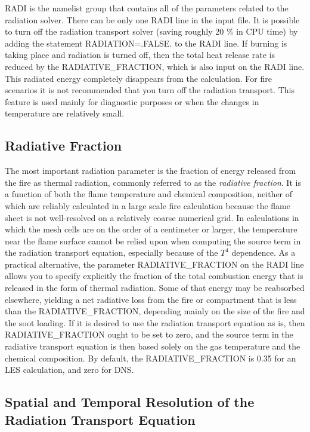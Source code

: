 \documentclass[11pt]{book}
\begin{document}
{\ct RADI} is the namelist group that contains all of the parameters related to the radiation solver. There can be only one
{\ct RADI} line in the input file. It is possible to turn off the radiation transport
solver (saving roughly 20 \% in CPU time) by adding the statement
{\ct RADIATION=.FALSE.} to the {\ct RADI} line.  If burning
is taking place and radiation is turned off, then the total heat
release rate is reduced by the {\ct RADIATIVE\_FRACTION}, which is
also input on the {\ct RADI} line. This radiated energy completely
disappears from the calculation. For fire scenarios it is not recommended that you turn off the
radiation transport. This feature is used mainly for diagnostic purposes or when the changes in
temperature are relatively small.

\subsection{Radiative Fraction}

The most important radiation parameter is the fraction of energy released from the
fire as thermal radiation, commonly referred to as the {\em radiative fraction}. It is a function of both the flame temperature
and chemical composition, neither of which are reliably calculated in a large
scale fire calculation because the flame sheet is not well-resolved on a relatively coarse numerical grid.
In calculations in which the mesh cells are on the order of a centimeter or
larger, the temperature near the flame surface cannot be relied upon when
computing the source term in the radiation transport equation, especially
because of the $T^4$ dependence.
As a practical alternative, the parameter {\ct RADIATIVE\_FRACTION} on the {\ct RADI} line allows you to specify explicitly the
fraction of the total combustion energy that is released in the form of thermal radiation.
Some of that energy may be reabsorbed elsewhere, yielding a net radiative
loss from the fire or compartment that is less than the {\ct RADIATIVE\_FRACTION}, depending mainly on the size of
the fire and the soot loading. If it is desired to use the radiation transport
equation as is, then {\ct RADIATIVE\_FRACTION} ought to be set to zero,
and the source term in the radiative transport equation is then based solely
on the gas temperature and the chemical composition. By default, the {\ct RADIATIVE\_FRACTION} is
0.35 for an LES calculation, and zero for DNS.


\subsection{Spatial and Temporal Resolution of the Radiation Transport Equation}
\end{document}
